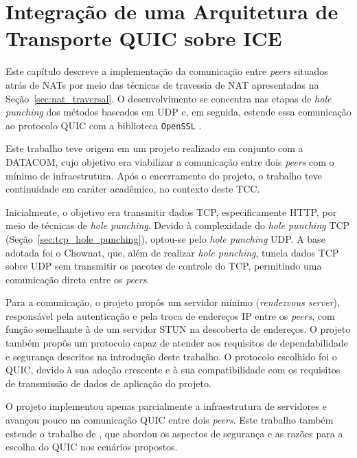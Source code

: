\chapter{Integração de uma Arquitetura de Transporte QUIC sobre ICE}
\label{chap:implementation}

Este capítulo descreve a implementação da comunicação entre \textit{peers} situados atrás de NATs por meio das técnicas de travessia de NAT apresentadas na Seção~\ref{sec:nat_traversal}. O desenvolvimento se concentra nas etapas de \textit{hole punching} dos métodos baseados em UDP e, em seguida, estende essa comunicação ao protocolo QUIC com a biblioteca \texttt{OpenSSL} \citep{openssl_quic}.

Este trabalho teve origem em um projeto realizado em conjunto com a DATACOM, cujo objetivo era viabilizar a comunicação entre dois \textit{peers} com o mínimo de infraestrutura. Após o encerramento do projeto, o trabalho teve continuidade em caráter acadêmico, no contexto deste TCC.

Inicialmente, o objetivo era transmitir dados TCP, especificamente HTTP, por meio de técnicas de \textit{hole punching}. Devido à complexidade do \textit{hole punching} TCP (Seção~\ref{sec:tcp_hole_punching}), optou-se pelo \textit{hole punching} UDP. A base adotada foi o Chownat, que, além de realizar \textit{hole punching}, tunela dados TCP sobre UDP sem transmitir os pacotes de controle do TCP, permitindo uma comunicação direta entre os \textit{peers}.

Para a comunicação, o projeto propôs um servidor mínimo (\textit{rendezvous server}), responsável pela autenticação e pela troca de endereços IP entre os \textit{peers}, com função semelhante à de um servidor STUN na descoberta de endereços. O projeto também propôs um protocolo capaz de atender aos requisitos de dependabilidade e segurança descritos na introdução deste trabalho. O protocolo escolhido foi o QUIC, devido à sua adoção crescente e à sua compatibilidade com os requisitos de transmissão de dados de aplicação do projeto.

O projeto implementou apenas parcialmente a infraestrutura de servidores e avançou pouco na comunicação QUIC entre dois \textit{peers}. Este trabalho também estende o trabalho de \citep{paladin2025quic}, que abordou os aspectos de segurança e as razões para a escolha do QUIC nos cenários propostos.

